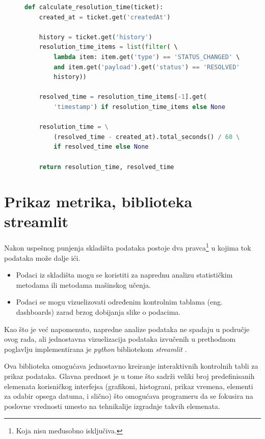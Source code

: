 \documentclass[12pt,oneside]{memoir}
\begin{document}
\begin{figure}[h]
\begin{lstlisting}[language=python, caption={Računanje konkretne metrike.}, label={lst:ticketetlconcretefunction}]
def calculate_resolution_time(ticket):
    created_at = ticket.get('createdAt')

    history = ticket.get('history')
    resolution_time_items = list(filter( \ 
        lambda item: item.get('type') == 'STATUS_CHANGED' \
        and item.get('payload').get('status') == 'RESOLVED', \
        history))

    resolved_time = resolution_time_items[-1].get(
        'timestamp') if resolution_time_items else None

    resolution_time = \
        (resolved_time - created_at).total_seconds() / 60 \
        if resolved_time else None

    return resolution_time, resolved_time
\end{lstlisting}
\end{figure}



\newpage
\section{Prikaz metrika, biblioteka streamlit}

Nakon uspešnog punjenja skladišta podataka postoje dva pravca\footnote{Koja nisu međusobno isključiva.} u kojima tok podataka može dalje ići.
\begin{itemize}
    \item Podaci iz skladišta mogu se koristiti za naprednu analizu statističkim metodama ili metodama mašinskog učenja.
    \item Podaci se mogu vizuelizovati određenim kontrolnim tablama (eng. dashboards) zarad brzog dobijanja slike o podacima.
\end{itemize}

Kao što je već napomenuto, napredne analize podataka ne spadaju u područje ovog rada, ali jednostavna vizuelizacija podataka izvučenih u prethodnom poglavlju implementirana je \textit{python} bibliotekom \textit{streamlit} \cite{streamlitdocs}.

Ova biblioteka omogućava jednostavno kreiranje interaktivnih kontrolnih tabli za prikaz podataka. Glavna prednost je u tome što sadrži veliki broj predefinisanih elemenata korisničkog interfejsa (grafikoni, histograni, prikaz vremena, elementi za odabir opsega datuma, i slično) što omogućava programeru da se fokusira na poslovne vrednosti umesto na tehnikalije izgradnje takvih elemenata. 
\end{document}

